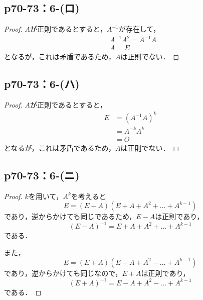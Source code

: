 \documentclass[a4paper,10pt,fleqn]{ltjsarticle}
\begin{document}
\subsection*{p70-73：6-(ロ)}


\begin{tleftbar}
    \begin{proof}
        $A$が正則であるとすると，$A^{-1}$が存在して，
        \begin{align*}
             & A^{-1} A^{2} = A^{-1} A \\
             & A = E
        \end{align*}
        となるが，これは矛盾であるため，$A$は正則でない．
    \end{proof}
\end{tleftbar}

\subsection*{p70-73：6-(ハ)}

\begin{tleftbar}
    \begin{proof}
        $A$が正則であるとすると，
        \begin{align*}
            E & = (A^{-1} A)^{k} \\
              & = A^{-k} A^{k}   \\
              & = O
        \end{align*}
        となるが，これは矛盾であるため，$A$は正則でない．
    \end{proof}
\end{tleftbar}

\subsection*{p70-73：6-(ニ)}

\begin{tleftbar}
    \begin{proof}
        $k$を用いて，$A^k$を考えると
        \[
            E = (E-A)(E+A+A^2+\dots+A^{k-1})
        \]
        であり，逆からかけても同じであるため，$E-A$は正則であり，
        \[
            (E-A)^{-1}=E+A+A^2+\dots+A^{k-1}
        \]
        である．

        また，
        \[
            E=(E+A)(E-A+A^2-\dots+A^{k-1})
        \]
        であり，逆からかけても同じなので，$E+A$は正則であり，
        \[
            (E+A)^{-1} = E-A+A^2-\dots+A^{k-1}
        \]
        である．
    \end{proof}
\end{tleftbar}
\end{document}
